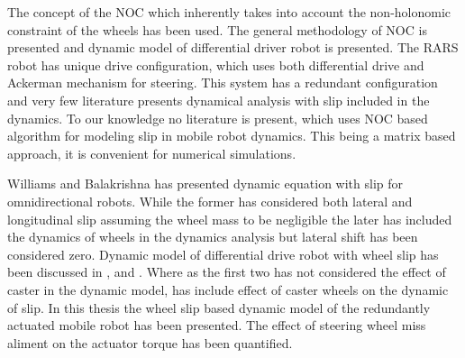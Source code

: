  The concept of the NOC which inherently takes into account the non-holonomic constraint of the wheels has been used. The general methodology of NOC is presented and dynamic model of differential driver robot is presented. 
 The RARS robot has unique  drive configuration, which uses both differential drive and Ackerman mechanism for steering. 
  This system has a redundant configuration and very few literature presents dynamical analysis with slip included in the dynamics. To our knowledge no literature is present, which uses NOC based algorithm for modeling slip in mobile robot dynamics.  This being a matrix based approach, it is convenient for numerical simulations. 
  
   Williams\cite{williams2002dynamic}  and Balakrishna  \cite{balakrishna1995modeling} has presented dynamic equation with slip for omnidirectional robots. 
   While the former has considered both lateral and longitudinal slip assuming the wheel mass to be negligible the later has included the dynamics of  wheels in the dynamics analysis but lateral shift has been considered zero.
    Dynamic model of differential drive robot with wheel slip has been discussed in \cite{tian2009modeling},\cite{sidek2008dynamic}  and \cite{konduri2014effect}.
    Where as the first two has not considered the effect of caster in the dynamic model, \cite{konduri2014effect} has include effect of caster wheels on the dynamic of slip. 
    In this thesis the wheel slip based dynamic model of the redundantly actuated mobile robot has been presented. The effect of steering wheel  miss aliment on the actuator torque has been quantified.

  
  
  
  
  
